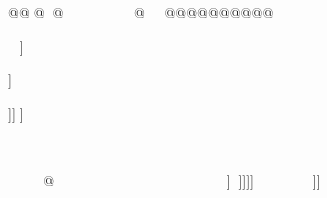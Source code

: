 @@@@@@@@@@@@@@@











]










]











]]]



























@]]]]]]]

























































